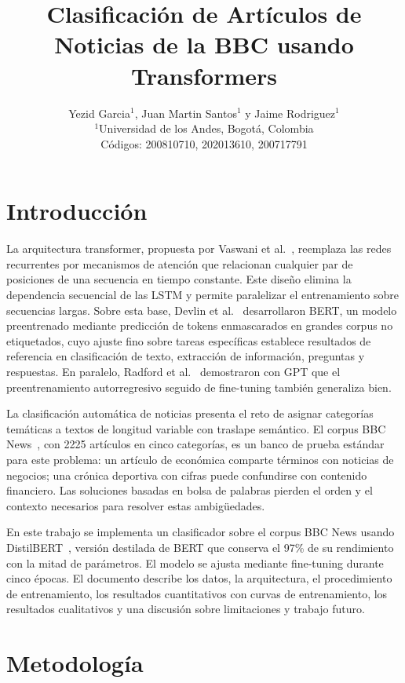 \documentclass[letterpaper, 10 pt, conference]{latex_template/ieeeconf}
\title{\LARGE \bf
Clasificación de Artículos de Noticias de la BBC usando Transformers
}
\author{Yezid Garcia$^{1}$, Juan Martin Santos$^{1}$ y Jaime Rodriguez$^{1}$ \\
{\small $^{1}$Universidad de los Andes, Bogotá, Colombia} \\
{\small Códigos: 200810710, 202013610, 200717791}
}
\begin{document}
\maketitle
\thispagestyle{empty}
\pagestyle{empty}

\section{Introducción}

La arquitectura transformer, propuesta por Vaswani et al.~\cite{c1}, reemplaza las redes recurrentes por mecanismos de atención que relacionan cualquier par de posiciones de una secuencia en tiempo constante. Este diseño elimina la dependencia secuencial de las LSTM y permite paralelizar el entrenamiento sobre secuencias largas. Sobre esta base, Devlin et al.~\cite{c2} desarrollaron BERT, un modelo preentrenado mediante predicción de tokens enmascarados en grandes corpus no etiquetados, cuyo ajuste fino sobre tareas específicas establece resultados de referencia en clasificación de texto, extracción de información, preguntas y respuestas. En paralelo, Radford et al.~\cite{c3} demostraron con GPT que el preentrenamiento autorregresivo seguido de fine-tuning también generaliza bien. 

La clasificación automática de noticias presenta el reto de asignar categorías temáticas a textos de longitud variable con traslape semántico. El corpus BBC News~\cite{c4}, con 2225 artículos en cinco categorías, es un banco de prueba estándar para este problema: un artículo de económica comparte términos con noticias de negocios; una crónica deportiva con cifras puede confundirse con contenido financiero. Las soluciones basadas en bolsa de palabras pierden el orden y el contexto necesarios para resolver estas ambigüedades.

En este trabajo se implementa un clasificador sobre el corpus BBC News usando DistilBERT~\cite{c5}, versión destilada de BERT que conserva el 97\% de su rendimiento con la mitad de parámetros. El modelo se ajusta mediante fine-tuning durante cinco épocas. El documento describe los datos, la arquitectura, el procedimiento de entrenamiento, los resultados cuantitativos con curvas de entrenamiento, los resultados cualitativos y una discusión sobre limitaciones y trabajo futuro.

\section{Metodología}
\end{document}
